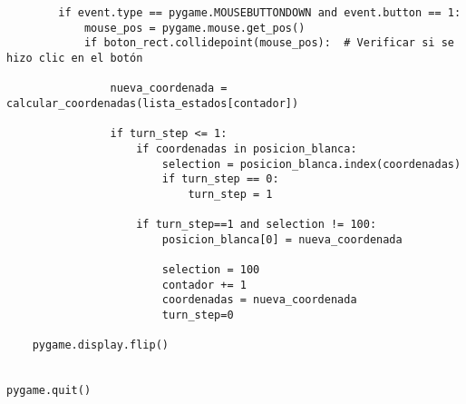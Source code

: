 \begin{lstlisting}
        if event.type == pygame.MOUSEBUTTONDOWN and event.button == 1:
            mouse_pos = pygame.mouse.get_pos()
            if boton_rect.collidepoint(mouse_pos):  # Verificar si se hizo clic en el botón
                
                nueva_coordenada = calcular_coordenadas(lista_estados[contador])
                
                if turn_step <= 1:
                    if coordenadas in posicion_blanca:
                        selection = posicion_blanca.index(coordenadas)
                        if turn_step == 0:
                            turn_step = 1
                        
                    if turn_step==1 and selection != 100:
                        posicion_blanca[0] = nueva_coordenada
                        
                        selection = 100
                        contador += 1
                        coordenadas = nueva_coordenada
                        turn_step=0

    pygame.display.flip()


pygame.quit()

\end{lstlisting}


